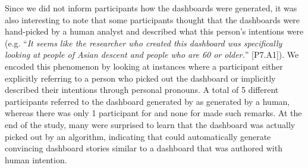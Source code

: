 \par Since we did not inform participants how the dashboards were generated, it was also interesting to note that some participants thought that the dashboards were hand-picked by a human analyst and described what this person's intentions were (e.g. ``\textit{It seems like the researcher who created this dashboard was specifically looking at people of Asian descent and people who are 60 or older.}'' [P7.A1]). We encoded this phenomenon by looking at instances where a participant either explicitly referring to a person who picked out the dashboard or implicitly described their intentions through personal pronouns. A total of 5 different participants referred to the dashboard generated by \system as generated by a human, whereas there was only 1 participant for \cluster and none for \BFS made such remarks. At the end of the study, many were surprised to learn that the \system dashboard was actually picked out by an algorithm, indicating that \system could automatically generate convincing dashboard stories similar to a dashboard that was authored with human intention.

